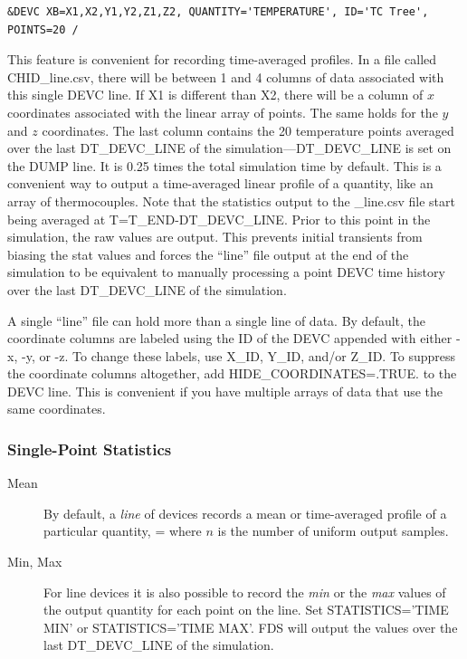 \documentclass[11pt]{book}
\begin{document}
\begin{lstlisting}
&DEVC XB=X1,X2,Y1,Y2,Z1,Z2, QUANTITY='TEMPERATURE', ID='TC Tree', POINTS=20 /
\end{lstlisting}

\noindent This feature is convenient for recording time-averaged profiles. In a file called {\ct CHID\_line.csv}, there will be between 1 and 4 columns of data associated with this single {\ct DEVC} line. If {\ct X1} is different than {\ct X2}, there will be a column of $x$ coordinates associated with the linear array of points. The same holds for the $y$ and $z$ coordinates. The last column contains the 20 temperature points averaged over the last {\ct DT\_DEVC\_LINE} of the simulation---{\ct DT\_DEVC\_LINE} is set on the {\ct DUMP} line.  It is 0.25 times the total simulation time by default. This is a convenient way to output a time-averaged linear profile of a quantity, like an array of thermocouples.  Note that the statistics output to the {\ct \_line.csv} file start being averaged at {\ct T=T\_END-DT\_DEVC\_LINE}.  Prior to this point in the simulation, the raw values are output.  This prevents initial transients from biasing the stat values and forces the ``line'' file output at the end of the simulation to be equivalent to manually processing a point {\ct DEVC} time history over the last {\ct DT\_DEVC\_LINE} of the simulation.

A single ``line'' file can hold more than a single line of data. By default, the coordinate columns are labeled using the {\ct ID} of the {\ct DEVC} appended with either {\ct -x}, {\ct -y}, or {\ct -z}. To change these labels, use {\ct X\_ID}, {\ct Y\_ID}, and/or {\ct Z\_ID}. To suppress the coordinate columns altogether, add {\ct HIDE\_COORDINATES=.TRUE.} to the {\ct DEVC} line. This is convenient if you have multiple arrays of data that use the same coordinates.

\subsubsection{Single-Point Statistics}

\begin{description}
\item[Mean] By default, a {\em line} of devices records a mean or time-averaged profile of a particular quantity,
\be
   \overline{\phi} = 
\ee
where $n$ is the number of uniform output samples.

\item[Min, Max] For line devices it is also possible to record the \emph{min} or the \emph{max} values of the output quantity for each point on the line.  Set {\ct STATISTICS='TIME MIN'} or {\ct STATISTICS='TIME MAX'}.  FDS will output the values over the last {\ct DT\_DEVC\_LINE} of the simulation.
\end{description}
\end{document}
